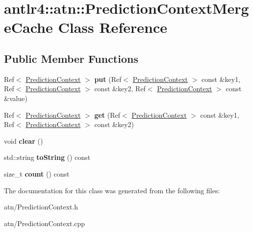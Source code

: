 \hypertarget{classantlr4_1_1atn_1_1PredictionContextMergeCache}{}\section{antlr4\+:\+:atn\+:\+:Prediction\+Context\+Merge\+Cache Class Reference}
\label{classantlr4_1_1atn_1_1PredictionContextMergeCache}
\subsection*{Public Member Functions}
\begin{DoxyCompactItemize}
\item 
\mbox{\label{classantlr4_1_1atn_1_1PredictionContextMergeCache_a24d2974eecee6ca37a97d7c988513ab8}} 
Ref$<$ \hyperlink{classantlr4_1_1atn_1_1PredictionContext}{Prediction\+Context} $>$ {\bfseries put} (Ref$<$ \hyperlink{classantlr4_1_1atn_1_1PredictionContext}{Prediction\+Context} $>$ const \&key1, Ref$<$ \hyperlink{classantlr4_1_1atn_1_1PredictionContext}{Prediction\+Context} $>$ const \&key2, Ref$<$ \hyperlink{classantlr4_1_1atn_1_1PredictionContext}{Prediction\+Context} $>$ const \&value)
\item 
\mbox{\label{classantlr4_1_1atn_1_1PredictionContextMergeCache_ab64fa022a6982f6a87bbf263e52013bb}} 
Ref$<$ \hyperlink{classantlr4_1_1atn_1_1PredictionContext}{Prediction\+Context} $>$ {\bfseries get} (Ref$<$ \hyperlink{classantlr4_1_1atn_1_1PredictionContext}{Prediction\+Context} $>$ const \&key1, Ref$<$ \hyperlink{classantlr4_1_1atn_1_1PredictionContext}{Prediction\+Context} $>$ const \&key2)
\item 
\mbox{\label{classantlr4_1_1atn_1_1PredictionContextMergeCache_acf7501a4cd385b70239191dfcf16e9c1}} 
void {\bfseries clear} ()
\item 
\mbox{\label{classantlr4_1_1atn_1_1PredictionContextMergeCache_a9a9bc9d9ba6433ae0ff2f5ac97761bbe}} 
std\+::string {\bfseries to\+String} () const
\item 
\mbox{\label{classantlr4_1_1atn_1_1PredictionContextMergeCache_a075f7dbc298341d93cfd8bafccfff8c7}} 
size\+\_\+t {\bfseries count} () const
\end{DoxyCompactItemize}


The documentation for this class was generated from the following files\+:\begin{DoxyCompactItemize}
\item 
atn/Prediction\+Context.\+h\item 
atn/Prediction\+Context.\+cpp\end{DoxyCompactItemize}
